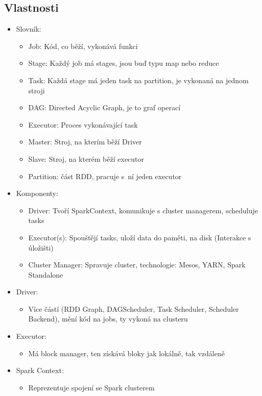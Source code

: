\subsection{Vlastnosti}
\begin{itemize}
    \item Slovník:
    \begin{itemize}
        \item Job: Kód, co běží, vykonává funkci
        \item Stage: Každý job má stages, jsou buď typu map nebo reduce
        \item Task: Každá stage má jeden task na partition, je vykonaná na jednom stroji
        \item DAG: Directed Acyclic Graph, je to graf operací
        \item Executor: Proces vykonávající task
        \item Master: Stroj, na kterím běží Driver
        \item Slave: Stroj, na kterém běží executor
        \item Partition: část RDD, pracuje s~ní jeden executor
    \end{itemize}
    \item Komponenty:
    \begin{itemize}
        \item Driver: Tvoří SparkContext, komunikuje s cluster managerem, scheduluje tasks
        \item Executor(s): Spouštějí tasks, uloží data do paměti, na disk (Interakce s úložišti)
        \item Cluster Manager: Spravuje cluster, technologie: Mesos, YARN, Spark Standalone
    \end{itemize}
    \item Driver:
    \begin{itemize}
        \item Více částí (RDD Graph, DAGScheduler, Task Scheduler, Scheduler Backend), mění kód na jobs, ty vykoná na clusteru
    \end{itemize}
    \item Executor:
    \begin{itemize}
        \item Má block manager, ten získává bloky jak lokálně, tak vzdáleně
    \end{itemize}
    \item Spark Context:
    \begin{itemize}
        \item Reprezentuje spojení se Spark clusterem

\end{itemize}
\end{itemize}
